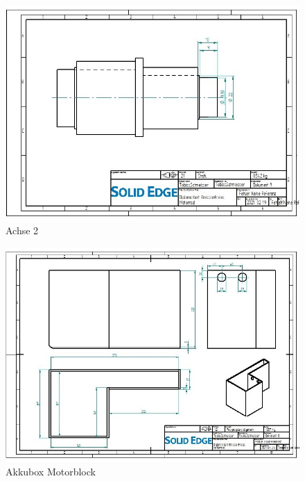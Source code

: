 \begin{figure} [H]
	\begin{center}
		\includegraphics[angle=90]{figures/mechanik/Achse_mit_nuten_20mm_Zeichnung.jpg}
		\caption{Achse 2}
		\label{fig:Achse2}
	\end{center}
\end{figure}


\begin{figure} [H]
	\begin{center}
		\includegraphics[angle=90]{figures/mechanik/Box_Zeichnung.jpg}
		\caption{Akkubox Motorblock}
		\label{fig:Akkubox Motorblock}
	\end{center}
\end{figure}


